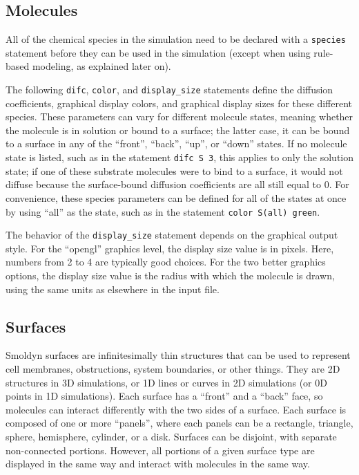\documentclass {scrbook}
\newcommand {\ttt} {\texttt}
\begin{document}
\subsection*{Molecules}

All of the chemical species in the simulation need to be declared with a  \ttt{species} statement before they can be used in the simulation (except when using rule-based modeling, as explained later on).

The following  \ttt{difc},  \ttt{color}, and  \ttt{display\_size} statements define the diffusion coefficients, graphical display colors, and graphical display sizes for these different species. These parameters can vary for different molecule states, meaning whether the molecule is in solution or bound to a surface; the latter case, it can be bound to a surface in any of the ``front'', ``back'', ``up'', or ``down'' states. If no molecule state is listed, such as in the statement  \ttt{difc S 3}, this applies to only the solution state; if one of these substrate molecules were to bind to a surface, it would not diffuse because the surface-bound diffusion coefficients are all still equal to 0. For convenience, these species parameters can be defined for all of the states at once by using ``all'' as the state, such as in the statement  \ttt{color S(all) green}.

The behavior of the \ttt{display\_size} statement depends on the graphical output style. For the ``opengl'' graphics level, the display size value is in pixels. Here, numbers from 2 to 4 are typically good choices. For the two better graphics options, the display size value is the radius with which the molecule is drawn, using the same units as elsewhere in the input file.

\subsection*{Surfaces}

Smoldyn surfaces are infinitesimally thin structures that can be used to represent cell membranes, obstructions, system boundaries, or other things. They are 2D structures in 3D simulations, or 1D lines or curves in 2D simulations (or 0D points in 1D simulations). Each surface has a ``front'' and a ``back'' face, so molecules can interact differently with the two sides of a surface. Each surface is composed of one or more ``panels'', where each panels can be a rectangle, triangle, sphere, hemisphere, cylinder, or a disk. Surfaces can be disjoint, with separate non-connected portions. However, all portions of a given surface type are displayed in the same way and interact with molecules in the same way.
\end{document}

